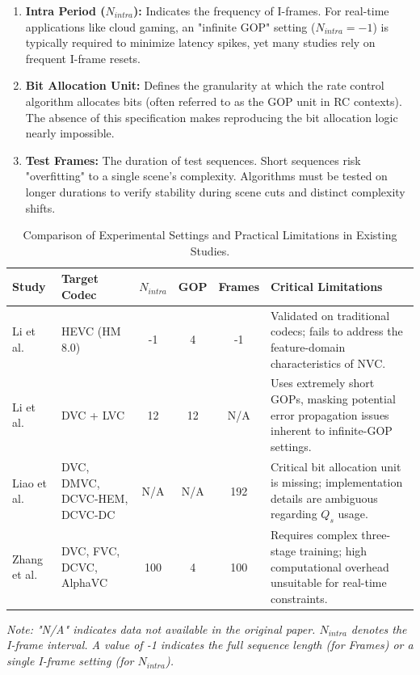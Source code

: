 \begin{enumerate}
    \item \textbf{Intra Period ($N_{intra}$):} Indicates the frequency of I-frames. For real-time applications like cloud gaming, an "infinite GOP" setting ($N_{intra} = -1$) is typically required to minimize latency spikes, yet many studies rely on frequent I-frame resets.
    \item \textbf{Bit Allocation Unit:} Defines the granularity at which the rate control algorithm allocates bits (often referred to as the GOP unit in RC contexts). The absence of this specification makes reproducing the bit allocation logic nearly impossible.
    \item \textbf{Test Frames:} The duration of test sequences. Short sequences risk "overfitting" to a single scene's complexity. Algorithms must be tested on longer durations to verify stability during scene cuts and distinct complexity shifts.
\end{enumerate}

\begin{table}[!h]
\centering
\caption{Comparison of Experimental Settings and Practical Limitations in Existing Studies.}
\label{tab:rc_limits_comparison}
\small
\renewcommand{\arraystretch}{1.4} %

\begin{tabularx}{\textwidth}{@{} l >{\raggedright\arraybackslash\hsize=0.65\hsize}X c c c >{\raggedright\arraybackslash\hsize=1.35\hsize}X @{}}
\toprule
\textbf{Study} & \textbf{Target Codec} & \textbf{\boldmath$N_{intra}$} & \textbf{GOP} & \textbf{Frames} & \textbf{Critical Limitations} \\ \midrule

Li et al.~\cite{50} & 
HEVC \newline (HM 8.0) & 
-1 & 
4 & 
-1 & 
Validated on traditional codecs; fails to address the feature-domain characteristics of NVC. \\ \midrule

Li et al.~\cite{51} & 
DVC + LVC & 
12 & 
12 & 
N/A & 
Uses extremely short GOPs, masking potential error propagation issues inherent to infinite-GOP settings. \\ \midrule

Liao et al.~\cite{52} & 
DVC, DMVC, DCVC-HEM, DCVC-DC & 
N/A & 
N/A & 
192 & 
Critical bit allocation unit is missing; implementation details are ambiguous regarding $Q_s$ usage. \\ \midrule

Zhang et al.~\cite{28} & 
DVC, FVC, DCVC, AlphaVC & 
100 & 
4 & 
100 & 
Requires complex three-stage training; high computational overhead unsuitable for real-time constraints. \\ \bottomrule
\end{tabularx}
\begin{flushleft}
\footnotesize{\textit{Note: "N/A" indicates data not available in the original paper. $N_{intra}$ denotes the I-frame interval. A value of -1 indicates the full sequence length (for Frames) or a single I-frame setting (for $N_{intra}$).}}
\end{flushleft}
\end{table}


